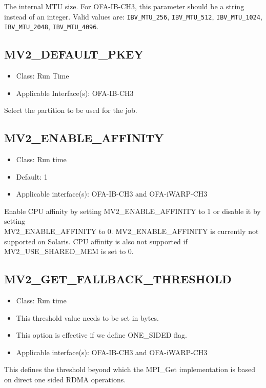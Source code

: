 The internal MTU size. For OFA-IB-CH3, this parameter should be a string instead
of an integer. Valid values are: \texttt{IBV\_MTU\_256}, \texttt{IBV\_MTU\_512},
\texttt{IBV\_MTU\_1024}, \texttt{IBV\_MTU\_2048}, \texttt{IBV\_MTU\_4096}.

\subsection{MV2\_DEFAULT\_PKEY}
\label{def:mv2-default-pkey}
\begin{itemize}
		\item Class: Run Time
		\item Applicable Interface(s): OFA-IB-CH3
\end{itemize}

Select the partition to be used for the job.

\subsection{MV2\_ENABLE\_AFFINITY}
\label{def:viadev_enable_affinity}

\begin{itemize}
    \item Class: Run time
    \item Default: 1
    \item Applicable interface(s): OFA-IB-CH3 and OFA-iWARP-CH3
\end{itemize}

Enable CPU affinity by setting MV2\_ENABLE\_AFFINITY to 1 or disable it by
setting \\
MV2\_ENABLE\_AFFINITY to 0. MV2\_ENABLE\_AFFINITY is currently not supported
on Solaris. CPU affinity is also not supported if MV2\_USE\_SHARED\_MEM is set to 0. 


\subsection{MV2\_GET\_FALLBACK\_THRESHOLD}
\begin{itemize}
        \item Class: Run time
        \item This threshold value needs to be set in bytes.
        \item This option is effective if we define ONE\_SIDED flag.
    \item Applicable interface(s): OFA-IB-CH3 and OFA-iWARP-CH3

\end{itemize}
This defines the threshold beyond which the MPI\_Get implementation is based on direct one sided RDMA operations.


